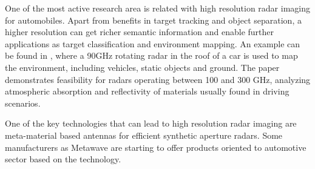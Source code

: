 \documentclass[journal]{IEEEtran}
\begin{document}
One of the most active research area is related with high resolution radar
imaging for automobiles. Apart from benefits in target tracking and object
separation, a higher resolution can get richer semantic information and enable
further applications as target classification and environment mapping. 
An example can be found in \cite{Reina2015}, where a 90GHz rotating radar in
the roof of a car is used to map the environment, including vehicles, static
objects and ground.
The paper \cite{Kohler2013} demonstrates feasibility for radars operating
between 100 and 300 GHz, analyzing atmospheric absorption and reflectivity of
materials usually found in driving scenarios.

One of the key technologies that can lead to high resolution radar imaging are 
meta-material based antennas \cite{Brookner2016,Sleasman2017} for efficient
synthetic aperture radars. 
Some manufacturers as Metawave 
are starting to offer products oriented to automotive sector based on the 
technology.

\end{document}
